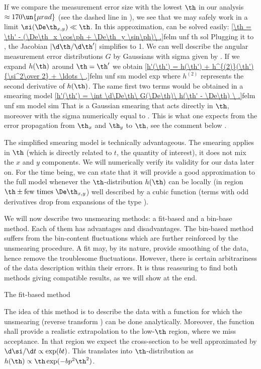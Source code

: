 If we compare the measurement error size  with the lowest $\th$ in our analysis $\approx 170\un{\mu rad}$ (see the dashed line in ), we see that we may safely work in a limit $\si(\De\th_{x, y}) \ll \th$. In this approximation,  can be solved easily:
\eqref{\th = \th' - (\De\th_x \cos\ph + \De\th_y \sin\ph)\ .}{felm unf th sol}
Plugging it to , the Jacobian $|\d\th/\d\th'|$ simplifies to 1. We can well describe the angular measurement error distributions $G$ by Gaussians with sigma given by . If we expand $h(\th)$ around $\th = \th'$ we obtain
\eqref{h'(\th') = h(\th') + h^{(2)}(\th') {\si^2\over 2} + \ldots \ ,}{felm unf sm model exp}
where $h^{(2)}$ represents the second derivative of $h(\th)$. The same first two terms would be obtained in a smearing model
\eqref{h'(\th') = \int \d\De\th\ G(\De\th)\ h(\th' - \De\th)  \ .}{felm unf sm model sim}
That is a Gaussian smearing that acts directly in $\th$, moreover with the sigma numerically equal to . This is what one expects from the error propagation from $\th_x$ and $\th_y$ to $\th$, see the comment below .

The simplified smearing model  is technically advantageous. The smearing applies in $\th$ (which is directly related to $t$, the quantity of interest), it does not mix the $x$ and $y$ components. We will numerically verify its validity for our data later on. For the time being, we can state that it will provide a good approximation to the full model  whenever the $\th$-distribution $h(\th)$ can be locally (in region $\th \pm \hbox{few times }\De\th_{x, y}$) well described by a cubic function (terms with odd derivatives drop from expansions of the type ).

We will now describe two unsmearing methods: a fit-based and a bin-base method. Each of them has advantages and disadvantages. The bin-based method suffers from the bin-content fluctuations which are further reinforced by the unsmearing procedure. A fit may, by its nature, provide smoothing of the data, hence remove the troublesome fluctuations. However, there is certain arbitrariness of the data description within their errors. It is thus reassuring to find both methods giving compatible results, as we will show at the end.


\caption{The fit-based method}

The idea of this method is to describe the data with a function for which the unsmearing (reverse transform ) can be done analytically. Moreover, the function shall provide a realistic extrapolation to the low-$\th$ region, where we miss acceptance. In that region we expect the cross-section to be well approximated by $\d\si/\d t \propto \exp(bt)$. This translates into $\th$-distribution as $h(\th) \propto \th \exp(-bp^2 \th^2)$.

